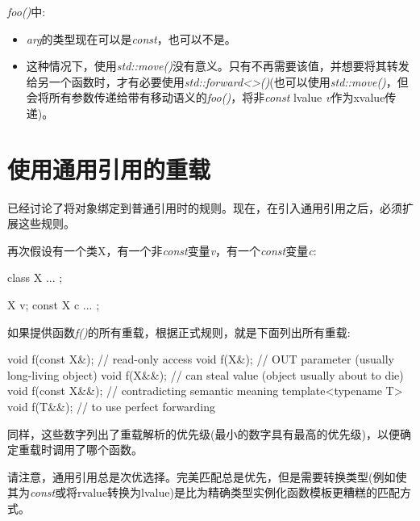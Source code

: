 \textit{foo()}中:\par

\begin{itemize}
  \item \textit{arg}的类型现在可以是\textit{const}，也可以不是。
  \item 这种情况下，使用\textit{std::move()}没有意义。只有不再需要该值，并想要将其转发给另一个函数时，才有必要使用\textit{std::\allowbreak{}forward<\allowbreak{}>(\allowbreak{})\allowbreak{}}(也可以使用\textit{std::move()}，但会将所有参数传递给带有移动语义的\textit{foo()}，将非\textit{const} lvalue \textit{v}作为xvalue传递)。
\end{itemize}


\section{使用通用引用的重载}

已经讨论了将对象绑定到普通引用时的规则。现在，在引入通用引用之后，必须扩展这些规则。\par

再次假设有一个类X，有一个非\textit{const}变量\textit{v}，有一个\textit{const}变量\textit{c}:\par

\begin{codebox}[cpp]
class X {
  ...
};

X v;
const X c{ ... };
\end{codebox}

如果提供函数\textit{f()}的所有重载，根据正式规则，就是下面列出所有重载:\par

\begin{codebox}[cpp]
void f(const X&); // read-only access
void f(X&); // OUT parameter (usually long-living object)
void f(X&&); // can steal value (object usually about to die)
void f(const X&&); // contradicting semantic meaning
template<typename T>
void f(T&&); // to use perfect forwarding
\end{codebox}


同样，这些数字列出了重载解析的优先级(最小的数字具有最高的优先级)，以便确定重载时调用了哪个函数。\par

请注意，通用引用总是次优选择。完美匹配总是优先，但是需要转换类型(例如使其为\textit{const}或将rvalue转换为lvalue)是比为精确类型实例化函数模板更糟糕的匹配方式。\par

